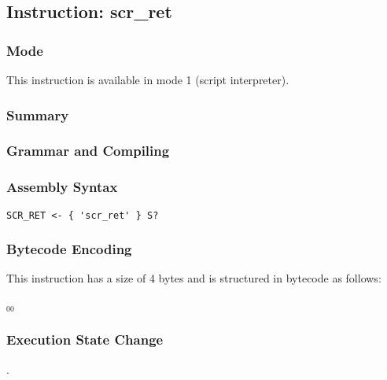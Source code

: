 \subsection{Instruction: scr\_ret}

\subsubsection{Mode}
This instruction is available in mode 1 (script interpreter).
\subsubsection{Summary}


\subsubsection{Grammar and Compiling}


\subsubsection{Assembly Syntax}

\begin{myquote}
\begin{verbatim}
SCR_RET <- { 'scr_ret' } S?
\end{verbatim}
\end{myquote}

\subsubsection{Bytecode Encoding}

This instruction has a size of 4 bytes and is structured in bytecode as follows:

$_{00}$\ 

\subsubsection{Execution State Change}

.


